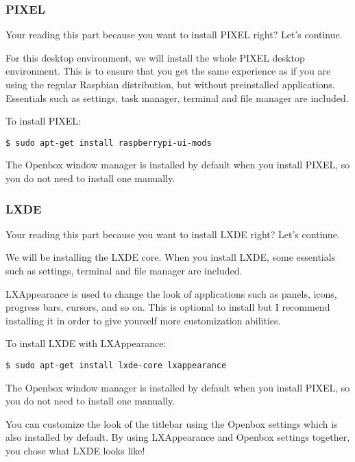 		\subsubsection*{PIXEL}
		
			Your reading this part because you want to install PIXEL right? Let's continue.
			
			For this desktop environment, we will install the whole PIXEL desktop environment. This is to ensure that you get the same experience as if you are using the regular Raspbian distribution, but without preinstalled applications. Essentials such as settings, task manager, terminal and file manager are included.
			
			To install PIXEL:
\begin{lstlisting}[style=Terminal, breaklines=true]
$ sudo apt-get install raspberrypi-ui-mods
\end{lstlisting}
			
			The Openbox window manager is installed by default when you install PIXEL, so you do not need to install one manually.
			
		\subsubsection*{LXDE}
			
			Your reading this part because you want to install LXDE right? Let's continue.
			
			We will be installing the LXDE core. When you install LXDE, some essentials such as settings, terminal and file manager are included.
			
			LXAppearance is used to change the look of applications such as panels, icons, progress bars, cursors, and so on. This is optional to install but I recommend installing it in order to give yourself more customization abilities.
			
			To install LXDE with LXAppearance:
\begin{lstlisting}[style=Terminal, breaklines=true]
$ sudo apt-get install lxde-core lxappearance
\end{lstlisting}

			The Openbox window manager is installed by default when you install PIXEL, so you do not need to install one manually.
			
			You can customize the look of the titlebar using the Openbox settings which is also installed by default. By using LXAppearance and Openbox settings together, you chose what LXDE looks like!
			

